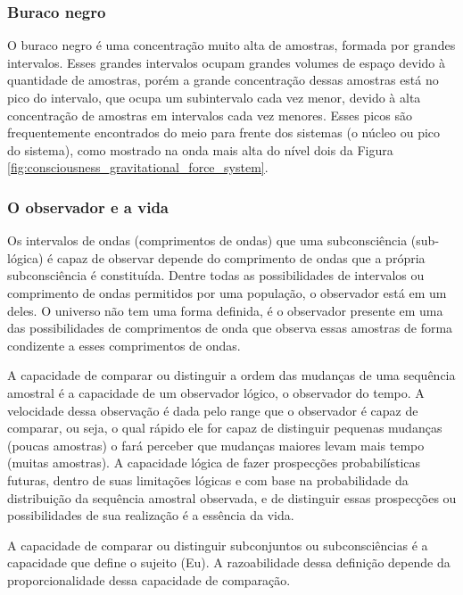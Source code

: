 \subsubsection{Buraco negro}
O buraco negro é uma concentração muito alta de amostras, formada por grandes intervalos. Esses grandes intervalos ocupam grandes volumes de espaço devido à quantidade de amostras, porém a grande concentração dessas amostras está no pico do intervalo, que ocupa um subintervalo cada vez menor, devido à alta concentração de amostras em intervalos cada vez menores. Esses picos são frequentemente encontrados do meio para frente dos sistemas (o núcleo ou pico do sistema), como mostrado na onda mais alta do nível dois da Figura \ref{fig:consciousness_gravitational_force_system}.

\subsubsection{O observador e a vida}
Os intervalos de ondas (comprimentos de ondas) que uma subconsciência (sub-lógica) é capaz de observar depende do comprimento de ondas que a própria subconsciência é constituída. Dentre todas as possibilidades de intervalos ou comprimento de ondas permitidos por uma população, o observador está em um deles. O universo não tem uma forma definida, é o observador presente em uma das possibilidades de comprimentos de onda que observa essas amostras de forma condizente a esses comprimentos de ondas. 

A capacidade de comparar ou distinguir a ordem das mudanças de uma sequência amostral é a capacidade de um observador lógico, o observador do tempo. A velocidade dessa observação é dada pelo range que o observador é capaz de comparar, ou seja, o qual rápido ele for capaz de distinguir pequenas mudanças (poucas amostras) o fará perceber que mudanças maiores levam mais tempo (muitas amostras). A capacidade lógica de fazer prospecções probabilísticas futuras, dentro de suas limitações lógicas e com base na probabilidade da distribuição da sequência amostral observada, e de distinguir essas prospecções ou possibilidades de sua realização é a essência da vida. 

A capacidade de comparar ou distinguir subconjuntos ou subconsciências é a capacidade que define o sujeito (Eu). A razoabilidade dessa definição depende da proporcionalidade dessa capacidade de comparação.

